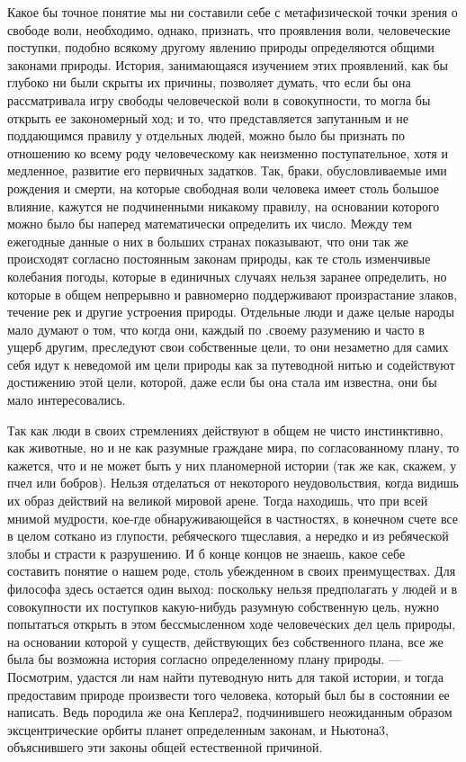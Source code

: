 \documentclass[a4paper]{book}
\begin{document}
Какое бы точное понятие мы ни составили себе с метафизической точки зрения о свободе воли, необходимо, однако, признать, что проявления воли, человеческие поступки, подобно всякому другому явлению природы определяются общими законами природы. История, занимающаяся изучением этих проявлений, как бы глубоко ни были скрыты их причины, позволяет думать, что если бы она рассматривала игру свободы человеческой воли в совокупности, то могла бы открыть ее закономерный ход; и то, что представляется запутанным и не поддающимся правилу у отдельных людей, можно было бы признать по отношению ко всему роду человеческому как неизменно поступательное, хотя и медленное, развитие его первичных задатков. Так, браки, обусловливаемые ими рождения и смерти, на которые свободная воли человека имеет столь большое влияние, кажутся не подчиненными никакому правилу, на основании которого можно было бы наперед математически определить их число. Между тем ежегодные данные о них в больших странах показывают, что они так же происходят согласно постоянным законам природы, как те столь изменчивые колебания погоды, которые в единичных случаях нельзя заранее определить, но которые в общем непрерывно и равномерно поддерживают произрастание злаков, течение рек и другие устроения природы. Отдельные люди и даже целые народы мало думают о том, что когда они, каждый по .своему разумению и часто в ущерб другим, преследуют свои собственные цели, то они незаметно для самих себя идут к неведомой им цели природы как за путеводной нитью и содействуют достижению этой цели, которой, даже если бы она стала им известна, они бы мало интересовались.

Так как люди в своих стремлениях действуют в общем не чисто инстинктивно, как животные, но и не как разумные граждане мира, по согласованному плану, то кажется, что и не может быть у них планомерной истории (так же как, скажем, у пчел или бобров). Нельзя отделаться от некоторого неудовольствия, когда видишь их образ действий на великой мировой арене. Тогда находишь, что при всей мнимой мудрости, кое-где обнаруживающейся в частностях, в конечном счете все в целом соткано из глупости, ребяческого тщеславия, а нередко и из ребяческой злобы и страсти к разрушению. И б конце концов не знаешь, какое себе составить понятие о нашем роде, столь убежденном в своих преимуществах. Для философа здесь остается один выход: поскольку нельзя предполагать у людей и в совокупности их поступков какую-нибудь разумную собственную цель, нужно попытаться открыть в этом бессмысленном ходе человеческих дел цель природы, на основании которой у существ, действующих без собственного плана, все же была бы возможна история согласно определенному плану природы. — Посмотрим, удастся ли нам найти путеводную нить для такой истории, и тогда предоставим природе произвести того человека, который был бы в состоянии ее написать. Ведь породила же она Кеплера2, подчинившего неожиданным образом эксцентрические орбиты планет определенным законам, и Ньютона3, объяснившего эти законы общей естественной причиной.
\end{document}
